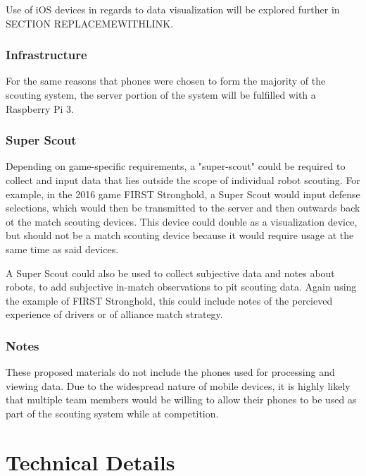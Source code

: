 \documentclass[11pt]{report}
\begin{document}
Use of iOS devices in regards to data visualization will be explored further in SECTION REPLACEMEWITHLINK.

\subsection{Infrastructure}

For the same reasons that phones were chosen to form the majority of the scouting system, the server portion of the system will be fulfilled with a Raspberry Pi 3.

\subsection{Super Scout}

Depending on game-specific requirements, a "super-scout" could be required to collect and input data that lies outside the scope of individual robot scouting. For example, in the 2016 game FIRST Stronghold, a Super Scout would input defense selections, which would then be transmitted to the server and then outwards back ot the match scouting devices. This device could double as a visualization device, but should not be a match scouting device because it would require usage at the same time as said devices.

A Super Scout could also be used to collect subjective data and notes about robots, to add subjective in-match observations to pit scouting data. Again using the example of FIRST Stronghold, this could include notes of the percieved experience of drivers or of alliance match strategy.

\subsection{Notes}

These proposed materials do not include the phones used for processing and viewing data. Due to the widespread nature of mobile devices, it is highly likely that multiple team members would be willing to allow their phones to be used as part of the scouting system while at competition.





\chapter{Technical Details}
\end{document}
